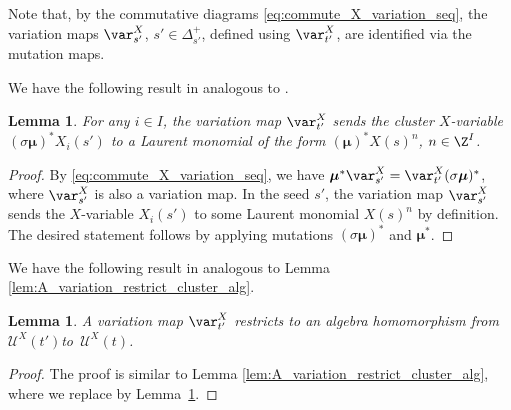 \documentclass[pdftex]{sigma}
\newcommand{\XClAlg}{\mathcal{U}^X}
\newcommand{\seq}{\boldsymbol{\mu}}%
\numberwithin{equation}{section}
\newtheorem{Lemma}[Theorem]{Lemma}
\begin{document}
Note that, by the commutative diagrams \eqref{eq:commute_X_variation_seq},
the variation maps $\var_{s'}^{X}$, $s'\in\Delta_{s'}^{+}$, defined
using $\var_{t'}^{X}$, are identified via the mutation maps.



 We have the following result in analogous to \cite[Lemma 4.2.2\,(ii)]{qin2017triangular}.
\begin{Lemma}\label{lem:variation_X_variables_similar}
For any $i\in I$, the variation map $\var_{t'}^X$ sends the cluster $X$-variable $(\sigma\seq)^* X_i(s')$ to a Laurent monomial of the form $(\seq)^* X(s)^n$, $n\in \Z^I$.
\end{Lemma}
\begin{proof}
By \eqref{eq:commute_X_variation_seq}, we have $\seq^*\var_{s'}^X =\var_{t'}^X(\sigma \seq)^*$, where $\var_{s'}^X$ is also a variation map. In the seed $s'$, the variation map $\var_{s'}^X$ sends the $X$-variable $X_i(s')$ to some Laurent monomial $X(s)^n$ by definition. The desired statement follows by applying mutations $(\sigma \seq)^*$ and $\seq^*$.
\end{proof}

We have the following result in analogous to Lemma \ref{lem:A_variation_restrict_cluster_alg}.
\begin{Lemma}\label{lem:X_variation_restrict_cluster_alg}
 A variation map $\var_{t'}^{X}$ restricts to an algebra homomorphism from $\XClAlg(t')$\linebreak to~$\XClAlg(t)$.
 \end{Lemma}
 \begin{proof}
The proof is similar to Lemma \ref{lem:A_variation_restrict_cluster_alg}, where we replace \cite[Lemma 4.2.2\,(ii)]{qin2017triangular} by Lem\-ma~\ref{lem:variation_X_variables_similar}.
 \end{proof}
\end{document}
